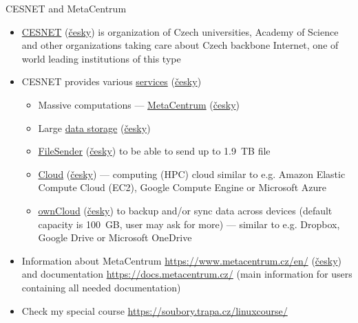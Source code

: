 \documentclass[compress, xelatex, 11pt, xcolor=svgnames, aspectratio=169,
	hyperref={
		bookmarks=true,
		unicode=true,
		colorlinks=true,
		pdftitle={Molecular data in R},
		plainpages=false,
		pdfauthor={Vojtech Zeisek},
		pdfsubject={Course about phylogeny and evolution in R},
		pdfcreator={XeLaTeX},
		pdfkeywords={R, evolution, phylogeny, molecular data},
		linkcolor=Crimson, %
		anchorcolor=Magenta, %
		citecolor=Magenta, %
		filecolor=Magenta, %
		menucolor=Magenta, %
		urlcolor=DodgerBlue, %
		},
	url={hyphens, lowtilde} %
	]{beamer}
\begin{document}
\begin{frame}{CESNET and MetaCentrum}
	\begin{itemize}
		\item \href{https://www.cesnet.cz/?lang=en}{CESNET} (\href{https://www.cesnet.cz/}{česky}) is organization of Czech universities, Academy of Science and other organizations taking care about Czech backbone Internet, one of world leading institutions of this type
		\item CESNET provides various \href{https://www.cesnet.cz/services/?lang=en}{services} (\href{https://www.cesnet.cz/sluzby/}{česky})
		\begin{itemize}
			\item Massive computations --- \href{https://www.cesnet.cz/services/massive-computations-metacentrum/?lang=en}{MetaCentrum} (\href{https://www.cesnet.cz/sluzby/metacentrum/}{česky})
			\item Large \href{https://www.cesnet.cz/services/data-storage/?lang=en}{data storage} (\href{https://www.cesnet.cz/sluzby/datova-uloziste/}{česky})
			\item \href{https://www.cesnet.cz/services/filesender/?lang=en}{FileSender} (\href{https://www.cesnet.cz/sluzby/filesender/}{česky}) to be able to send up to 1.9~TB file
			\item \href{https://www.metacentrum.cz/en/Sluzby/Cloud/}{Cloud} (\href{https://www.metacentrum.cz/cs/Sluzby/Cloud/}{česky}) --- computing (HPC) cloud similar to e.g. Amazon Elastic Compute Cloud (EC2), Google Compute Engine or Microsoft Azure
			\item \href{https://www.cesnet.cz/services/owncloud/?lang=en}{ownCloud} (\href{https://www.cesnet.cz/sluzby/owncloud/}{česky}) to backup and/or sync data across devices (default capacity is 100~GB, user may ask for more) --- similar to e.g. Dropbox, Google Drive or Microsoft OneDrive
		\end{itemize}
		\item Information about MetaCentrum \url{https://www.metacentrum.cz/en/} (\href{https://www.metacentrum.cz/cs/}{česky}) and documentation \url{https://docs.metacentrum.cz/} (main information for users containing all needed documentation)
		\item Check my special course \url{https://soubory.trapa.cz/linuxcourse/}
	\end{itemize}
\end{frame}
\end{document}
